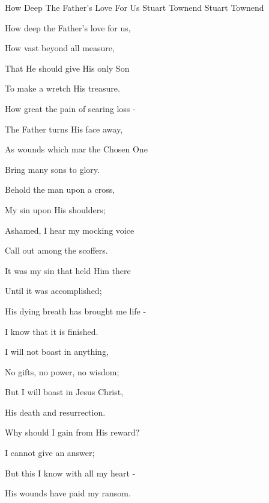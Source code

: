 \documentclass[12pt]{book}
\begin{document}
\begin{song}{How Deep The Father's Love For Us}{}
  { Stuart Townend}
  {Stuart Townend}
  {}
  {}

  \begin{SBVerse}
    How deep the Father's love for us,

    How vast beyond all measure,

    That He should give His only Son

    To make a wretch His treasure.

    How great the pain of searing loss -

    The Father turns His face away,

    As wounds which mar the Chosen One

    Bring many sons to glory.
  \end{SBVerse}

  \begin{SBVerse}
    Behold the man upon a cross,

    My sin upon His shoulders;

    Ashamed, I hear my mocking voice

    Call out among the scoffers.

    It was my sin that held Him there

    Until it was accomplished;

    His dying breath has brought me life -

    I know that it is finished.
  \end{SBVerse}

  \begin{SBVerse}
    I will not boast in anything,

    No gifts, no power, no wisdom;

    But I will boast in Jesus Christ,

    His death and resurrection.

    Why should I gain from His reward?

    I cannot give an answer;

    But this I know with all my heart -

    His wounds have paid my ransom.
  \end{SBVerse}
\end{song}
\end{document}

